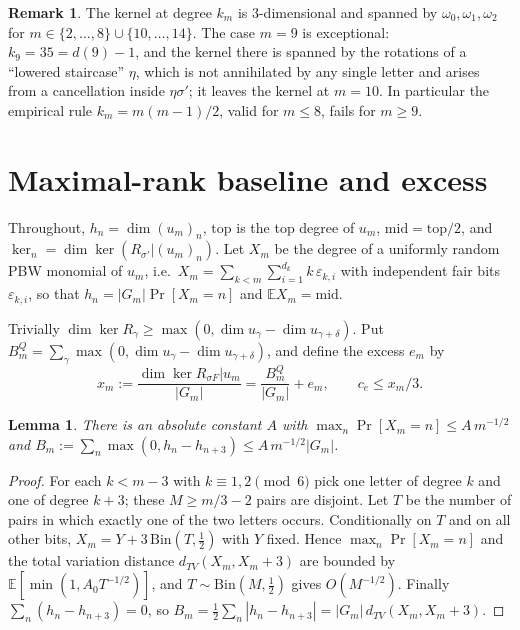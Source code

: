 \documentclass[11pt]{amsart}
\newtheorem{lemma}[theorem]{Lemma}
\theoremstyle{definition}
\newtheorem{remark}[theorem]{Remark}
\begin{document}
\begin{remark}
The kernel at degree $k_m$ is $3$-dimensional and spanned by $\omega_0,\omega_1,\omega_2$ for $m\in\{2,\dots,8\}\cup\{10,\dots,14\}$.
The case $m=9$ is exceptional: $k_9=35=d(9)-1$, and the kernel there is spanned by the rotations of a ``lowered
staircase'' $\eta$, which is not annihilated by any single letter and arises from a cancellation inside
$\eta\sigma'$; it leaves the kernel at $m=10$. In particular the empirical rule $k_m=m(m-1)/2$, valid for $m\le8$,
fails for $m\ge9$.
\end{remark}

\section{Maximal-rank baseline and excess}\label{sec:excess}

Throughout, $h_n=\dim(u_m)_n$, $\mathrm{top}$ is the top degree of $u_m$, $\mathrm{mid}=\mathrm{top}/2$, and
$\ker_n=\dim\ker(R_{\sigma'}|(u_m)_n)$. Let $X_m$ be the degree of a uniformly random PBW monomial of $u_m$, i.e.\
$X_m=\sum_{k<m}\sum_{i=1}^{d_k}k\,\varepsilon_{k,i}$ with independent fair bits $\varepsilon_{k,i}$, so that
$h_n=|G_m|\Pr[X_m=n]$ and $\mathbb E X_m=\mathrm{mid}$.

Trivially $\dim\ker R_\gamma\ge\max(0,\dim u_\gamma-\dim u_{\gamma+\delta})$. Put
$B^Q_m=\sum_\gamma\max(0,\dim u_\gamma-\dim u_{\gamma+\delta})$, and define the excess $e_m$ by
\[
  x_m:=\frac{\dim\ker R_{\sigma F}|u_m}{|G_m|}=\frac{B^Q_m}{|G_m|}+e_m,\qquad c_e\le x_m/3 .
\]

\begin{lemma}\label{lem:anticonc}
There is an absolute constant $A$ with $\max_n\Pr[X_m=n]\le A\,m^{-1/2}$ and
$B_m:=\sum_n\max(0,h_n-h_{n+3})\le A\,m^{-1/2}|G_m|$.
\end{lemma}

\begin{proof}
For each $k<m-3$ with $k\equiv1,2\pmod 6$ pick one letter of degree $k$ and one of degree $k+3$; these $M\ge m/3-2$
pairs are disjoint. Let $T$ be the number of pairs in which exactly one of the two letters occurs. Conditionally on
$T$ and on all other bits, $X_m=Y+3\,\mathrm{Bin}(T,\tfrac12)$ with $Y$ fixed. Hence $\max_n\Pr[X_m=n]$ and the total
variation distance $d_{TV}(X_m,X_m+3)$ are bounded by $\mathbb E[\min(1,A_0T^{-1/2})]$, and $T\sim\mathrm{Bin}(M,\tfrac12)$
gives $O(M^{-1/2})$. Finally $\sum_n(h_n-h_{n+3})=0$, so $B_m=\tfrac12\sum_n|h_n-h_{n+3}|=|G_m|\,d_{TV}(X_m,X_m+3)$.
\end{proof}
\end{document}
